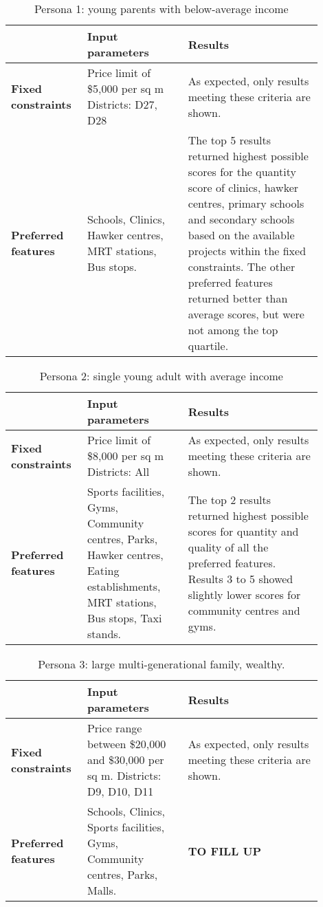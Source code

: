 \documentclass[a4paper, 11pt]{article}
\begin{document}
\begin{table}[ht]
    \centering
    \begin{tabular}{p{0.2\linewidth} | p{0.3\linewidth} | p{0.4\linewidth}} \hline
      & \textbf{Input parameters}  & \textbf{Results} \\ \hline
      \textbf{Fixed constraints }& Price limit of \$5,000 per sq m
Districts: D27, D28  & As expected, only results meeting these criteria are shown. \\ \hline
\textbf{Preferred features} & Schools, Clinics, Hawker centres, MRT stations, Bus stops. & The top 5 results returned highest possible scores for the quantity score of clinics, hawker centres,  primary schools and secondary schools based on the available projects within the fixed constraints. The other preferred features returned better than average scores, but were not among the top quartile. \\\hline
    \end{tabular}
    \caption{Persona 1: young parents with below-average income}
    \label{tab:my_label}
\end{table}

\begin{table}[ht]
    \centering
    \begin{tabular}{p{0.2\linewidth} | p{0.3\linewidth} | p{0.4\linewidth}} \hline
      & \textbf{Input parameters}  & \textbf{Results} \\ \hline
      \textbf{Fixed constraints }& Price limit of \$8,000 per sq m
Districts: All & As expected, only results meeting these criteria are shown. \\ \hline
\textbf{Preferred features} & 
Sports facilities, Gyms, Community centres, Parks, Hawker centres, Eating establishments, MRT stations, Bus stops, Taxi stands. & 
The top 2 results returned highest possible scores for quantity and quality of all the preferred features. Results 3 to 5 showed slightly lower scores for community centres and gyms. 

 \\\hline
    \end{tabular}
    \caption{Persona 2: single young adult with average income}
    \label{tab:my_label}
\end{table}


\begin{table}[ht]
    \centering
    \begin{tabular}{p{0.2\linewidth} | p{0.3\linewidth} | p{0.4\linewidth}} \hline
      & \textbf{Input parameters}  & \textbf{Results} \\ \hline
      \textbf{Fixed constraints }& Price range between \$20,000 and \$30,000 per sq m. Districts: D9, D10, D11 
 & As expected, only results meeting these criteria are shown. \\ \hline
\textbf{Preferred features} & 
Schools, Clinics, Sports facilities, Gyms, Community centres, Parks, Malls. & 
\textbf{TO FILL UP}

 \\\hline
    \end{tabular}
    \caption{Persona 3: large multi-generational family, wealthy.
}
    \label{tab:my_label}
\end{table}
\end{document}
